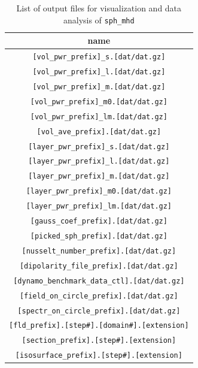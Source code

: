 \begin{table}[htp]
\caption{List of output files for visualization and data analysis of {\tt sph\_mhd} }
\begin{center} 
\begin{tabular}{|c|}
\hline
 name  \\ \hline \hline
\verb|[vol_pwr_prefix]_s.[dat/dat.gz]|   \\ \hline
\verb|[vol_pwr_prefix]_l.[dat/dat.gz]|   \\
\verb|[vol_pwr_prefix]_m.[dat/dat.gz]|   \\
\verb|[vol_pwr_prefix]_m0.[dat/dat.gz]|   \\
\verb|[vol_pwr_prefix]_lm.[dat/dat.gz]|   \\
\verb|[vol_ave_prefix].[dat/dat.gz]|   \\ \hline
\verb|[layer_pwr_prefix]_s.[dat/dat.gz]|   \\
\verb|[layer_pwr_prefix]_l.[dat/dat.gz]|   \\
\verb|[layer_pwr_prefix]_m.[dat/dat.gz]|   \\
\verb|[layer_pwr_prefix]_m0.[dat/dat.gz]|   \\
\verb|[layer_pwr_prefix]_lm.[dat/dat.gz]|   \\ \hline
\verb|[gauss_coef_prefix].[dat/dat.gz]|     \\
\verb|[picked_sph_prefix].[dat/dat.gz]|     \\ \hline
\verb|[nusselt_number_prefix].[dat/dat.gz]|     \\ \hline
\verb|[dipolarity_file_prefix].[dat/dat.gz]|     \\ \hline
\verb|[dynamo_benchmark_data_ctl].[dat/dat.gz]|     \\ \hline
\verb|[field_on_circle_prefix].[dat/dat.gz]|     \\ \hline
\verb|[spectr_on_circle_prefix].[dat/dat.gz]|     \\ \hline
\verb|[fld_prefix].[step#].[domain#].[extension]|   \\ \hline
\verb|[section_prefix].[step#].[extension]|   \\
\verb|[isosurface_prefix].[step#].[extension]|  \\ \hline
\end{tabular}
\end{center}
\label{table:sph_mhd_out}
\end{table}
%
%
